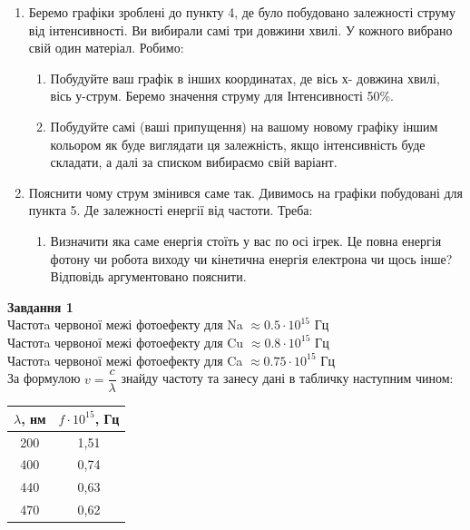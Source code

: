 \documentclass[a4paper,14pt]{extreport}
\begin{document}
\begin{enumerate}
		\item Беремо  графіки зроблені до пункту 4, де було побудовано залежності струму від інтенсивності. Ви вибирали самі три довжини хвилі. У кожного вибрано свій один матеріал. Робимо:
		\begin{enumerate}[label=2.\arabic*]
			\item Побудуйте ваш графік в інших координатах, де вісь х- довжина хвилі, вісь у-струм. Беремо значення струму для Інтенсивності 50\%.
			\item Побудуйте самі (ваші припущення) на вашому новому графіку іншим кольором як буде виглядати ця залежність, якщо інтенсивність буде складати, а далі за списком вибираємо свій варіант.
		\end{enumerate}
		\item Пояснити чому струм змінився саме так. Дивимось на графіки побудовані для пункта 5. Де залежності енергії від частоти. Треба:
		\begin{enumerate}[label=3.\arabic*]
			\item Визначити яка саме енергія стоїть у вас по осі ігрек. Це повна енергія фотону чи робота виходу чи кінетична енергія електрона чи щось інше? Відповідь аргументовано пояснити.
		\end{enumerate}
\end{enumerate}
\newpage
	
\textbf{Завдання 1}\\[1cm]
Частотa червоної межі фотоефекту для Na $\approx  0.5 \cdot 10^{15}$ Гц \\
Частотa червоної межі фотоефекту для Cu $\approx  0.8 \cdot 10^{15}$ Гц \\
Частотa червоної межі фотоефекту для Ca $\approx  0.75 \cdot  10^{15}$ Гц\\ 
	

	За формулою $v = \dfrac{c}{\lambda}$ знайду  частоту та занесу дані в табличку наступним чином:
	
	
	\begin{table}[h]
		\begin{center}
			\begin{tabular}{|c|c|}
			\hline
			$\lambda$, нм & $f \cdot 10^{15}$,  Гц \\ \hline
			200               & 1,51                   \\ \hline
			400               & 0,74                  \\ \hline
			440               & 0,63                 \\ \hline
			470               & 0,62                  \\ \hline
			\end{tabular}
		\end{center}
	\end{table}
	
\end{document}
